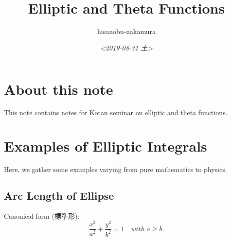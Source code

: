 \documentclass{article}
\author{hisanobu-nakamura}
\date{\textit{<2019-08-31 土>}}
\title{Elliptic and Theta Functions}
\begin{document}
\maketitle
\tableofcontents


\section{About this note}
\label{sec-1}
This note contains notes for Kotan seminar on elliptic and theta functions.

\section{Examples of Elliptic Integrals}
\label{sec-2}
Here, we gather some examples varying from pure mathematics to physics.
\subsection{Arc Length of Ellipse}
\label{sec-2-1}
Canonical form (標準形):
\begin{equation}
\frac{x^{2}}{a^{2}} +\frac{y^{2}}{b^{2}}=1 \quad with \; a \ge b.
\end{equation}
\end{document}
